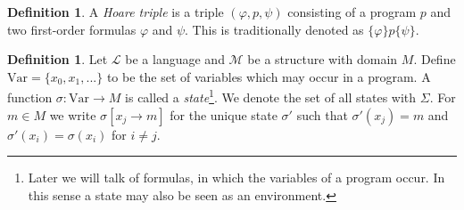 \documentclass[acmsmall]{acmart}
\theoremstyle{plain}
\theoremstyle{definition}
\newtheorem{definition}[theorem]{Definition}
\newcommand{\calL}{\mathcal{L}}
\newcommand{\calM}{\mathcal{M}}
\newcommand{\hoare}[3]{\{#1\}#2\{#3\}}
\begin{document}
\begin{definition}
	A \emph{Hoare triple} is a triple $(\varphi,p,\psi)$ consisting of a program $p$ and two first-order formulas $\varphi$ and $\psi$. This is traditionally denoted as $\hoare{\varphi}{p}{\psi}$. 
\end{definition}


\begin{definition}
	Let $\calL$ be a language and $\calM$ be a structure with domain $M$. Define $\mathrm{Var} = \{x_0,x_1,...\}$ to be the set of variables which may occur in a program. A function $\sigma: \mathrm{Var} \rightarrow M$ is called a \emph{state}\footnote{Later we will talk of formulas, in which the variables of a program occur. In this sense a state may also be seen as an environment.}. We denote the set of all states with $\Sigma$. For $m \in M$ we write $\sigma[x_j \rightarrow m]$ for the unique state $\sigma'$ such that $\sigma'(x_j) = m$ and $\sigma'(x_i)= \sigma(x_i)$ for $i \neq j$.
\end{definition}
\end{document}
